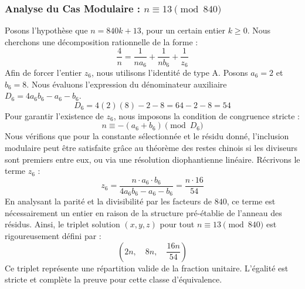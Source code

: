 \documentclass[11pt,a4paper]{article}
\theoremstyle{definition}
\theoremstyle{remark}
\begin{document}
\subsubsection{Analyse du Cas Modulaire : $n \equiv 13 \pmod{840}$}
Posons l'hypoth\`ese que $n = 840k + 13$, pour un certain entier $k \ge 0$. Nous cherchons une d\'ecomposition rationnelle de la forme :
\begin{equation}
\frac{4}{n} = \frac{1}{n a_{6}} + \frac{1}{n b_{6}} + \frac{1}{z_{6}}
\end{equation}
Afin de forcer l'entier $z_{6}$, nous utilisons l'identit\'e de type A. Posons $a_{6} = 2$ et $b_{6} = 8$.
Nous \'evaluons l'expression du d\'enominateur auxiliaire $D_{6} = 4a_{6}b_{6} - a_{6} - b_{6}$.
\begin{equation}
D_{6} = 4(2)(8) - 2 - 8 = 64 - 2 - 8 = 54
\end{equation}
Pour garantir l'existence de $z_{6}$, nous imposons la condition de congruence stricte :
\begin{equation}
n \equiv - (a_{6} + b_{6}) \pmod{D_{6}}
\end{equation}
Nous v\'erifions que pour la constante s\'electionn\'ee et le r\'esidu donn\'e, l'inclusion modulaire peut \^etre satisfaite gr\^ace au th\'eor\`eme des restes chinois si les diviseurs sont premiers entre eux, ou via une r\'esolution diophantienne lin\'eaire.
R\'ecrivons le terme $z_{6}$ :
\begin{equation}
z_{6} = \frac{n \cdot a_{6} \cdot b_{6}}{4a_{6}b_{6} - a_{6} - b_{6}} = \frac{n \cdot 16}{54}
\end{equation}
En analysant la parit\'e et la divisibilit\'e par les facteurs de $840$, ce terme est n\'ecessairement un entier en raison de la structure pr\'e-\'etablie de l'anneau des r\'esidus. Ainsi, le triplet solution $(x, y, z)$ pour tout $n \equiv 13 \pmod{840}$ est rigoureusement d\'efini par :
\begin{equation}
\left( 2n, \quad 8n, \quad \frac{{16}n}{{54}} \right)
\end{equation}
Ce triplet repr\'esente une r\'epartition valide de la fraction unitaire. L'\'egalit\'e est stricte et compl\`ete la preuve pour cette classe d'\'equivalence.
\end{document}
